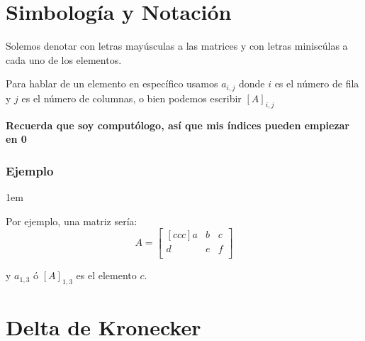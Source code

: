 \documentclass[12pt, fleqn]{report}                             %
\newenvironment{SmallIndentation}[1][0.75em]                    %
        {\begin{adjustwidth}{#1}{}\begin{footnotesize}}             %
        {\end{footnotesize}\end{adjustwidth}}                       %
\theoremstyle{break}                                            %
\begin{document}
        \section{Simbología y Notación}

            Solemos denotar con letras mayúsculas a las matrices y con letras miniscúlas
            a cada uno de los elementos.

            Para hablar de un elemento en específico usamos $a_{i,j}$ donde $i$ es el
            número de fila y $j$ es el número de columnas, o bien podemos escribir $[A]_{i,j}$

            \textbf{Recuerda que soy computólogo, así que mis índices pueden empiezar en 0}


            \subsubsection*{Ejemplo}
                \begin{SmallIndentation}[1em]
                    
                    Por ejemplo, una matriz sería:
                    \begin{equation*}
                        A =
                        \begin{bmatrix}[ccc]
                            a & b & c   \\
                            d & e & f   \\
                        \end{bmatrix}
                    \end{equation*}

                    y $a_{1,3}$ ó $[A]_{1, 3}$ es el elemento $c$.
                
                \end{SmallIndentation}
                


        \vspace{1em}
        \section{Delta de Kronecker}
\end{document}

